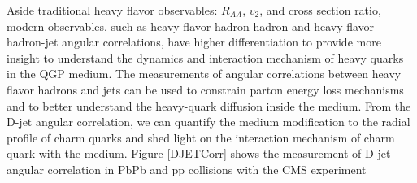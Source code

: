 Aside traditional heavy flavor observables: $R_{AA}$, $v_{2}$, and cross section ratio, modern observables, such as heavy flavor hadron-hadron and heavy flavor hadron-jet angular correlations, have higher differentiation to provide more insight to understand the dynamics and interaction mechanism of heavy quarks in the QGP medium. The measurements of angular correlations between heavy flavor hadrons and jets can be used to constrain parton energy loss mechanisms and to better understand the heavy-quark diffusion inside the medium. From the D-jet angular correlation, we can quantify the medium modification to the radial profile of charm quarks and shed light on the interaction mechanism of charm quark with the medium. Figure \ref{DJETCorr} shows the measurement of D-jet angular correlation in PbPb and pp collisions with the CMS experiment \cite{CMSDJet}

